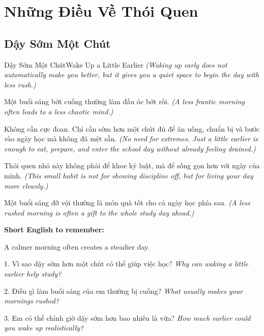 \chapter{Những Điều Về Thói Quen}

\section{Dậy Sớm Một Chút}
\begin{truyen}{Dậy Sớm Một Chút}{Wake Up a Little Earlier}
\textit{(Waking up early does not automatically make you better, but it gives you a quiet space to begin the day with less rush.)}

Một buổi sáng bớt cuống thường làm đầu óc bớt rối.
\textit{(A less frantic morning often leads to a less chaotic mind.)}

Không cần cực đoan. Chỉ cần sớm hơn một chút đủ để ăn uống, chuẩn bị và bước vào ngày học mà không đã mệt sẵn.
\textit{(No need for extremes. Just a little earlier is enough to eat, prepare, and enter the school day without already feeling drained.)}

Thói quen nhỏ này không phải để khoe kỷ luật, mà để sống gọn hơn với ngày của mình.
\textit{(This small habit is not for showing discipline off, but for living your day more cleanly.)}
\end{truyen}

\begin{baihoc}
Một buổi sáng đỡ vội thường là món quà tốt cho cả ngày học phía sau.
\textit{(A less rushed morning is often a gift to the whole study day ahead.)}
\end{baihoc}

\begin{ghinhoanh}
\textbf{Short English to remember:}

A calmer morning often creates a steadier day.

\end{ghinhoanh}

\begin{tuhocnhanh}
1. Vì sao dậy sớm hơn một chút có thể giúp việc học? \textit{Why can waking a little earlier help study?}

2. Điều gì làm buổi sáng của em thường bị cuống? \textit{What usually makes your mornings rushed?}

3. Em có thể chỉnh giờ dậy sớm hơn bao nhiêu là vừa? \textit{How much earlier could you wake up realistically?}
\end{tuhocnhanh}
\ngancach

